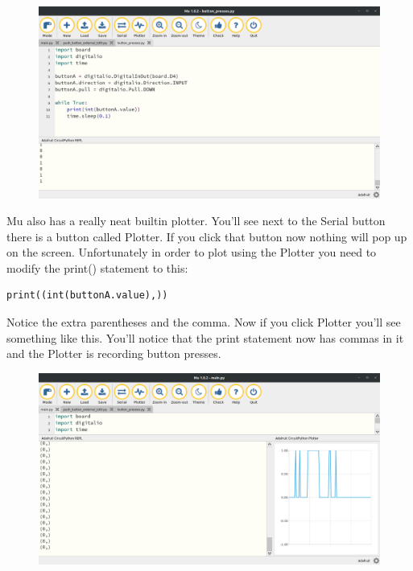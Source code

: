 \begin{figure}[H]
  \begin{center}
    \includegraphics[width=\textwidth]{Figures/MuButtonPress.png}
  \end{center}
\end{figure}
Mu also has a really neat builtin plotter. You’ll see next to the
Serial button there is a button called Plotter. If you click that
button now nothing will pop up on the screen. Unfortunately in order
to plot using the Plotter you need to modify the print() statement to
this:
\begin{verbatim}
print((int(buttonA.value),))
\end{verbatim}
Notice the extra parentheses and the comma. Now if you click Plotter
you’ll see something like this. You’ll notice that the print statement
now has commas in it and the Plotter is recording button presses. 
\begin{figure}[H]
  \begin{center}
    \includegraphics[width=\textwidth]{Figures/MuPlotter.png}
  \end{center}
\end{figure}
